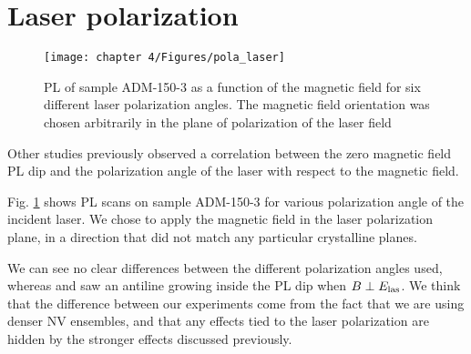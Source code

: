 \documentclass[a4paper, 11pt]{book}
\begin{document}
\section{Laser polarization}
\begin{figure}[h]
\centering
\texttt{[image: chapter 4/Figures/pola\_laser]}
\caption{PL of sample ADM-150-3 as a function of the magnetic field for six different laser polarization angles. The magnetic field orientation was chosen arbitrarily in the plane of polarization of the laser field}
\label{pola laser}
\end{figure}

Other studies \citep{anishchik2015low, filimonenko2020weak} previously observed a correlation between the zero magnetic field PL dip and the polarization angle of the laser with respect to the magnetic field. 

Fig. \ref{pola laser} shows PL scans on sample ADM-150-3 for various polarization angle of the incident laser. We chose to apply the magnetic field in the laser polarization plane, in a direction that did not match any particular crystalline planes.

We can see no clear differences between the different polarization angles used, whereas \citep{anishchik2015low} and \citep{filimonenko2020weak} saw an antiline growing inside the PL dip when $B \perp E_{\rm las}$. We think that the difference between our experiments come from the fact that we are using denser NV ensembles, and that any effects tied to the laser polarization are hidden by the stronger effects discussed previously.

\printbibliography
\end{document}
